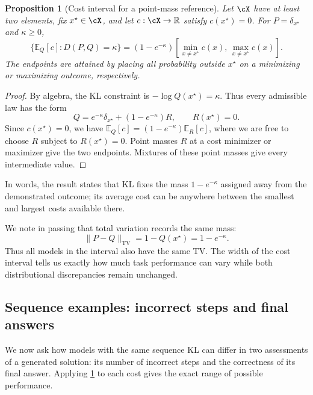 \documentclass[11pt,twoside]{article}
\newcommand{\R}{\mathbb R}
\newcommand{\E}{\mathbb E}
\newcommand{\KL}{D}
\newcommand{\tv}[1]{\lVert #1\rVert_{\mathrm{TV}}}
\newtheorem{proposition}[theorem]{Proposition}
\theoremstyle{definition}
\theoremstyle{remark}
\begin{document}
\begin{proposition}[Cost interval for a point-mass reference]
\label{prop:point-mass-cost-interval}
Let \(\cX\) have at least two elements, fix \(x^\star\in\cX\), and
let \(c:\cX\to\R\) satisfy \(c(x^\star)=0\).
For \(P=\delta_{x^\star}\) and \(\kappa\ge0\),
\begin{equation}
 \{\E_Q[c]:\KL(P, Q)=\kappa\}
 =(1-e^{-\kappa})
 \left[\min_{x\ne x^\star}c(x),\,
       \max_{x\ne x^\star}c(x)\right].
 \label{eq:point-mass-cost-interval}
\end{equation}
The endpoints are attained by placing all probability outside
\(x^\star\) on a minimizing or maximizing outcome, respectively.
\end{proposition}

\begin{proof}
By algebra, the KL constraint is \(-\log Q(x^\star)=\kappa\). Thus every
admissible law has the form
\begin{equation}
 Q=e^{-\kappa}\delta_{x^\star}+(1-e^{-\kappa})R,
 \qquad R(x^\star)=0.
 \label{eq:point-mass-mixture}
\end{equation}
Since $c(x^\star)=0$, we have
$\E_Q[c]=(1-e^{-\kappa})\E_R[c]$,
where we are free to choose $R$ subject to $R(x^\star)=0$.
Point masses \(R\) at a cost minimizer or maximizer give the two
endpoints. Mixtures of these point masses give every intermediate value.
\end{proof}

In words, the result states that
KL fixes the mass \(1-e^{-\kappa}\) assigned away from the demonstrated
outcome; its average cost can be anywhere between the smallest and
largest costs available there.

We note in passing that total variation records the same mass:
\[
 \tv{P-Q}=1-Q(x^\star)=1-e^{-\kappa}.
\]
Thus all models in the interval also have the same TV.
The width of the cost interval tells us exactly how much task performance
can vary while both distributional discrepancies remain unchanged.

\subsection{Sequence examples: incorrect steps and final answers}
\label{sec:binary-intervals}

We now ask how models with the same sequence KL can differ in two
assessments of a generated solution: its number of incorrect steps
and the correctness of its final answer. Applying
\cref{prop:point-mass-cost-interval} to each cost gives the exact
range of possible performance.
\end{document}
